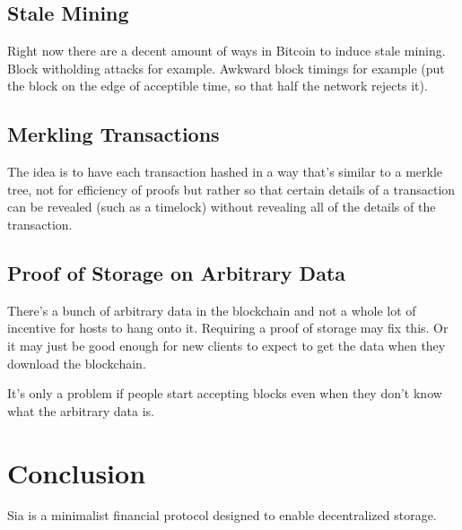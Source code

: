 \documentclass[twocolumn]{article}
\begin{document}
\subsection{Stale Mining}
Right now there are a decent amount of ways in Bitcoin to induce stale mining.
Block witholding attacks for example.
Awkward block timings for example (put the block on the edge of acceptible time, so that half the network rejects it).

\subsection{Merkling Transactions}
The idea is to have each transaction hashed in a way that's similar to a merkle tree, not for efficiency of proofs but rather so that certain details of a transaction can be revealed (such as a timelock) without revealing all of the details of the transaction.

\subsection{Proof of Storage on Arbitrary Data}
There's a bunch of arbitrary data in the blockchain and not a whole lot of incentive for hosts to hang onto it.
Requiring a proof of storage may fix this.
Or it may just be good enough for new clients to expect to get the data when they download the blockchain.

It's only a problem if people start accepting blocks even when they don't know what the arbitrary data is.

\section{Conclusion}
Sia is a minimalist financial protocol designed to enable decentralized storage.



\end{document}
